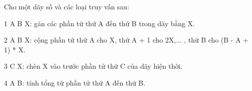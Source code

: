 Cho một dãy số và các loại truy vấn sau:  

   1 A B X: gán các phần từ thứ A đến thứ B trong dãy bằng X.  

   2 A B X: cộng phần tử thứ A cho X, thứ A + 1 cho 2X,... , thứ B cho (B - A + 1) * X.  

   3 C X: chèn X vào trước phần tử thứ C của dãy hiện thời.  

   4 A B: tính tổng từ phần tử thứ A đến thứ B.